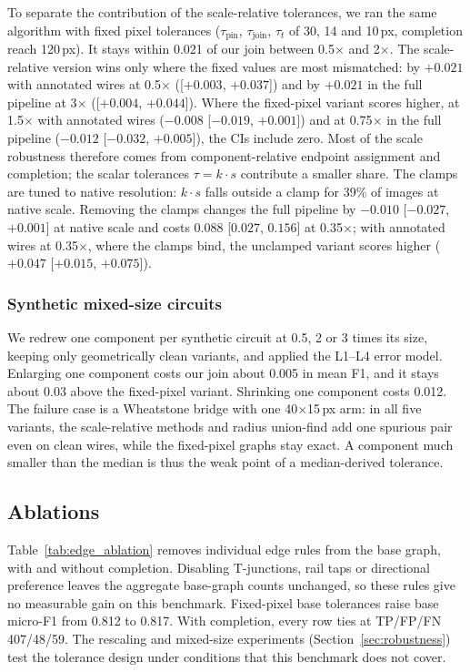 \documentclass{ieeeaccess}
\begin{document}
To separate the contribution of the scale-relative tolerances, we ran the same algorithm with fixed pixel tolerances ($\tau_{\text{pin}}$, $\tau_{\text{join}}$, $\tau_t$ of 30, 14 and 10\,px, completion reach 120\,px). It stays within 0.021 of our join between 0.5$\times$ and 2$\times$. The scale-relative version wins only where the fixed values are most mismatched: by $+0.021$ with annotated wires at 0.5$\times$ ([$+0.003$, $+0.037$]) and by $+0.021$ in the full pipeline at 3$\times$ ([$+0.004$, $+0.044$]). Where the fixed-pixel variant scores higher, at 1.5$\times$ with annotated wires ($-0.008$ [$-0.019$, $+0.001$]) and at 0.75$\times$ in the full pipeline ($-0.012$ [$-0.032$, $+0.005$]), the CIs include zero. Most of the scale robustness therefore comes from component-relative endpoint assignment and completion; the scalar tolerances $\tau=k\cdot s$ contribute a smaller share. The clamps are tuned to native resolution: $k\cdot s$ falls outside a clamp for 39\% of images at native scale. Removing the clamps changes the full pipeline by $-0.010$ [$-0.027$, $+0.001$] at native scale and costs $0.088$ [$0.027$, $0.156$] at 0.35$\times$; with annotated wires at 0.35$\times$, where the clamps bind, the unclamped variant scores higher ($+0.047$ [$+0.015$, $+0.075$]).

\subsubsection{Synthetic mixed-size circuits}
We redrew one component per synthetic circuit at 0.5, 2 or 3 times its size, keeping only geometrically clean variants, and applied the L1--L4 error model. Enlarging one component costs our join about 0.005 in mean F1, and it stays about 0.03 above the fixed-pixel variant. Shrinking one component costs 0.012. The failure case is a Wheatstone bridge with one 40$\times$15\,px arm: in all five variants, the scale-relative methods and radius union-find add one spurious pair even on clean wires, while the fixed-pixel graphs stay exact. A component much smaller than the median is thus the weak point of a median-derived tolerance.

\subsection{Ablations}
\label{sec:mech_ablation}

Table~\ref{tab:edge_ablation} removes individual edge rules from the base graph, with and without completion. Disabling T-junctions, rail taps or directional preference leaves the aggregate base-graph counts unchanged, so these rules give no measurable gain on this benchmark. Fixed-pixel base tolerances raise base micro-F1 from 0.812 to 0.817. With completion, every row ties at TP/FP/FN 407/48/59. The rescaling and mixed-size experiments (Section~\ref{sec:robustness}) test the tolerance design under conditions that this benchmark does not cover.
\end{document}
